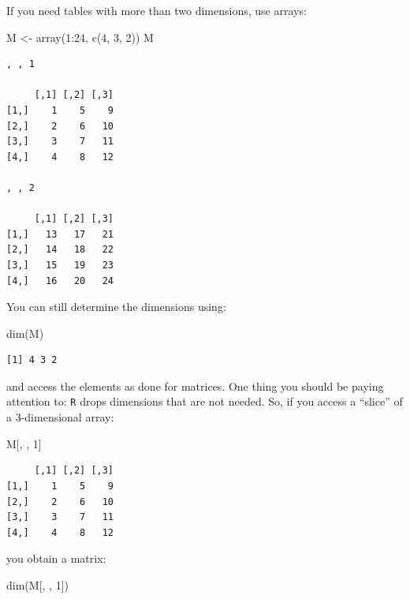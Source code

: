 \documentclass[
  letterpaper,
  DIV=11,
  numbers=noendperiod]{scrreprt}
\newenvironment{Shaded}{\begin{snugshade}}{\end{snugshade}}
\newcommand{\DecValTok}[1]{\textcolor[rgb]{0.68,0.00,0.00}{#1}}
\newcommand{\FunctionTok}[1]{\textcolor[rgb]{0.28,0.35,0.67}{#1}}
\newcommand{\NormalTok}[1]{\textcolor[rgb]{0.00,0.23,0.31}{#1}}
\newcommand{\OtherTok}[1]{\textcolor[rgb]{0.00,0.23,0.31}{#1}}
\newcommand{\SpecialCharTok}[1]{\textcolor[rgb]{0.37,0.37,0.37}{#1}}
\begin{document}
If you need tables with more than two dimensions, use arrays:

\begin{Shaded}
\begin{Highlighting}[]
\NormalTok{M }\OtherTok{\textless{}{-}} \FunctionTok{array}\NormalTok{(}\DecValTok{1}\SpecialCharTok{:}\DecValTok{24}\NormalTok{, }\FunctionTok{c}\NormalTok{(}\DecValTok{4}\NormalTok{, }\DecValTok{3}\NormalTok{, }\DecValTok{2}\NormalTok{))}
\NormalTok{M }
\end{Highlighting}
\end{Shaded}

\begin{verbatim}
, , 1

     [,1] [,2] [,3]
[1,]    1    5    9
[2,]    2    6   10
[3,]    3    7   11
[4,]    4    8   12

, , 2

     [,1] [,2] [,3]
[1,]   13   17   21
[2,]   14   18   22
[3,]   15   19   23
[4,]   16   20   24
\end{verbatim}

You can still determine the dimensions using:

\begin{Shaded}
\begin{Highlighting}[]
\FunctionTok{dim}\NormalTok{(M)}
\end{Highlighting}
\end{Shaded}

\begin{verbatim}
[1] 4 3 2
\end{verbatim}

and access the elements as done for matrices. One thing you should be
paying attention to: \texttt{R} drops dimensions that are not needed.
So, if you access a ``slice'' of a 3-dimensional array:

\begin{Shaded}
\begin{Highlighting}[]
\NormalTok{M[, , }\DecValTok{1}\NormalTok{]}
\end{Highlighting}
\end{Shaded}

\begin{verbatim}
     [,1] [,2] [,3]
[1,]    1    5    9
[2,]    2    6   10
[3,]    3    7   11
[4,]    4    8   12
\end{verbatim}

you obtain a matrix:

\begin{Shaded}
\begin{Highlighting}[]
\FunctionTok{dim}\NormalTok{(M[, , }\DecValTok{1}\NormalTok{])}
\end{Highlighting}
\end{Shaded}
\end{document}
